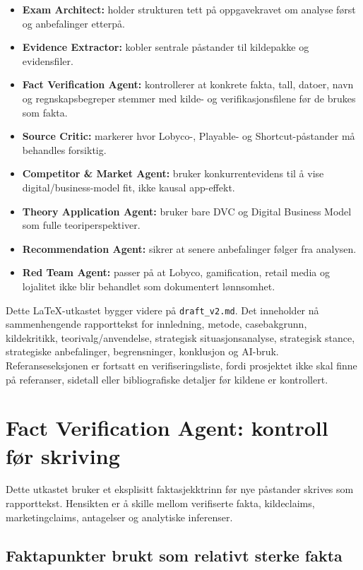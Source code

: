 \documentclass[12pt,a4paper]{article}
\begin{document}
\begin{itemize}
  \item \textbf{Exam Architect:} holder strukturen tett på oppgavekravet om analyse først og anbefalinger etterpå.
  \item \textbf{Evidence Extractor:} kobler sentrale påstander til kildepakke og evidensfiler.
  \item \textbf{Fact Verification Agent:} kontrollerer at konkrete fakta, tall, datoer, navn og regnskapsbegreper stemmer med kilde- og verifikasjonsfilene før de brukes som fakta.
  \item \textbf{Source Critic:} markerer hvor Lobyco-, Playable- og Shortcut-påstander må behandles forsiktig.
  \item \textbf{Competitor \& Market Agent:} bruker konkurrentevidens til å vise digital/business-model fit, ikke kausal app-effekt.
  \item \textbf{Theory Application Agent:} bruker bare DVC og Digital Business Model som fulle teoriperspektiver.
  \item \textbf{Recommendation Agent:} sikrer at senere anbefalinger følger fra analysen.
  \item \textbf{Red Team Agent:} passer på at Lobyco, gamification, retail media og lojalitet ikke blir behandlet som dokumentert lønnsomhet.
\end{itemize}

Dette LaTeX-utkastet bygger videre på \texttt{draft\_v2.md}. Det inneholder nå sammenhengende rapporttekst for innledning, metode, casebakgrunn, kildekritikk, teorivalg/anvendelse, strategisk situasjonsanalyse, strategisk stance, strategiske anbefalinger, begrensninger, konklusjon og AI-bruk. Referanseseksjonen er fortsatt en verifiseringsliste, fordi prosjektet ikke skal finne på referanser, sidetall eller bibliografiske detaljer før kildene er kontrollert.

\section*{Fact Verification Agent: kontroll før skriving}

Dette utkastet bruker et eksplisitt faktasjekktrinn før nye påstander skrives som rapporttekst. Hensikten er å skille mellom verifiserte fakta, kildeclaims, marketingclaims, antagelser og analytiske inferenser.

\subsection*{Faktapunkter brukt som relativt sterke fakta}
\end{document}
